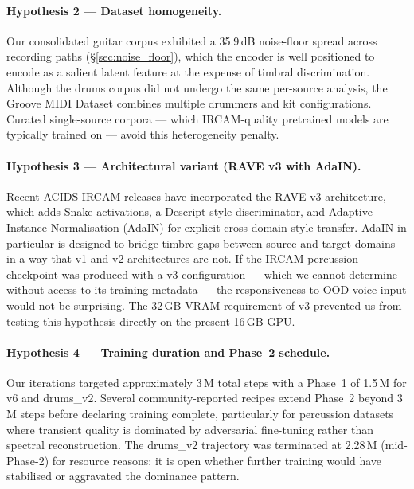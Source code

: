 \documentclass[a4paper,11pt,oneside,openany]{book}
\begin{document}
\paragraph{Hypothesis 2 --- Dataset homogeneity.} Our consolidated guitar corpus exhibited a 35.9\,dB noise-floor spread across recording paths (\S\ref{sec:noise_floor}), which the encoder is well positioned to encode as a salient latent feature at the expense of timbral discrimination. Although the drums corpus did not undergo the same per-source analysis, the Groove MIDI Dataset combines multiple drummers and kit configurations. Curated single-source corpora --- which IRCAM-quality pretrained models are typically trained on --- avoid this heterogeneity penalty.

\paragraph{Hypothesis 3 --- Architectural variant (RAVE v3 with AdaIN).} Recent ACIDS-IRCAM releases have incorporated the RAVE v3 architecture, which adds Snake activations, a Descript-style discriminator, and Adaptive Instance Normalisation (AdaIN) for explicit cross-domain style transfer. AdaIN in particular is designed to bridge timbre gaps between source and target domains in a way that v1 and v2 architectures are not. If the IRCAM percussion checkpoint was produced with a v3 configuration --- which we cannot determine without access to its training metadata --- the responsiveness to OOD voice input would not be surprising. The 32\,GB VRAM requirement of v3 prevented us from testing this hypothesis directly on the present 16\,GB GPU.

\paragraph{Hypothesis 4 --- Training duration and Phase~2 schedule.} Our iterations targeted approximately 3\,M total steps with a Phase~1 of 1.5\,M for v6 and drums\_v2. Several community-reported recipes extend Phase~2 beyond 3\,M steps before declaring training complete, particularly for percussion datasets where transient quality is dominated by adversarial fine-tuning rather than spectral reconstruction. The drums\_v2 trajectory was terminated at 2.28\,M (mid-Phase-2) for resource reasons; it is open whether further training would have stabilised or aggravated the dominance pattern.
\end{document}
